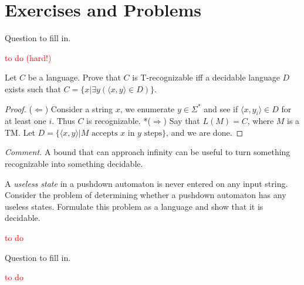 
\section*{Exercises and Problems}

\setcounter{exercise}{13}

\begin{exercise}{4.14}
  Question to fill in.
\end{exercise}

\textcolor{red}{to do (hard!)}

\setcounter{exercise}{17}

\begin{exercise}{4.18}
  Let $C$ be a language. Prove that $C$ is T-recognizable iff a decidable language $D$ exists such that $C=\{x|\exists y(\langle x,y\rangle\in D)\}$.
\end{exercise}

\begin{proof}
  ($\Leftarrow$) Consider a string $x$, we enumerate $y\in \Sigma^*$ and see if $\langle x,y_i\rangle\in D$ for at least one $i$. Thus $C$ is recognizable. *($\Rightarrow$) Say that $L(M)=C$, where $M$ is a TM. Let $D=\{\langle x,y\rangle|M\text{ accepts }x\text{ in }y\text{ steps}\}$, and we are done.
\end{proof}

\textit{Comment.} A bound that can approach infinity can be useful to turn something recognizable into something decidable.

\setcounter{exercise}{23}

\begin{exercise}{4.24}
  A \textit{useless state} in a pushdown automaton is never entered on any input string. Consider the problem of determining whether a pushdown automaton has any useless states. Formulate this problem as a language and show that it is decidable.
\end{exercise}

\textcolor{red}{to do}

\setcounter{exercise}{26}

\begin{exercise}{4.26}
  Question to fill in.
\end{exercise}

\textcolor{red}{to do}
